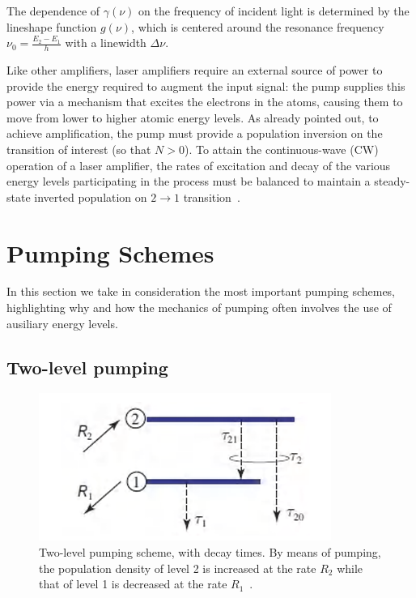 \documentclass[prl,twocolumn]{revtex4-1}
\begin{document}
The dependence of $\gamma(\nu)$ on the frequency of incident light is determined by the lineshape function $g(\nu)$, which is centered around the resonance frequency $\nu_0 = \frac{E_2 - E_1}{h}$ with a linewidth \(\Delta \nu\).

Like other amplifiers, laser amplifiers require an external source of power to provide the energy required to augment the input signal: the pump supplies this power via a mechanism that excites the electrons in the atoms, causing them to move from lower to higher atomic energy levels. As already pointed out, to achieve amplification, the pump must provide a population inversion on the transition of interest (so that $N > 0$). To attain the continuous-wave (CW) operation of a laser amplifier, the rates of excitation and decay of the various energy levels participating in the process must be balanced to maintain a steady-state inverted population on $2 \rightarrow 1$ transition~\cite{Siegman1986}. 

\section{Pumping Schemes}
In this section we take in consideration the most important pumping schemes, highlighting why and how the mechanics of pumping often involves the use of ausiliary energy levels.

\subsection{Two-level pumping}

\begin{figure}[!b]
    \centering
    \includegraphics[width=0.7\linewidth]{Images/two_level_scheme.png}
    \caption{Two-level pumping scheme, with decay times. By means of pumping, the population density of level 2 is increased at the rate $R_2$ while that of level 1 is decreased at the rate $R_1$~\cite{Saleh2007}.}
    \label{fig:two_level_scheme}
\end{figure}
\end{document}
